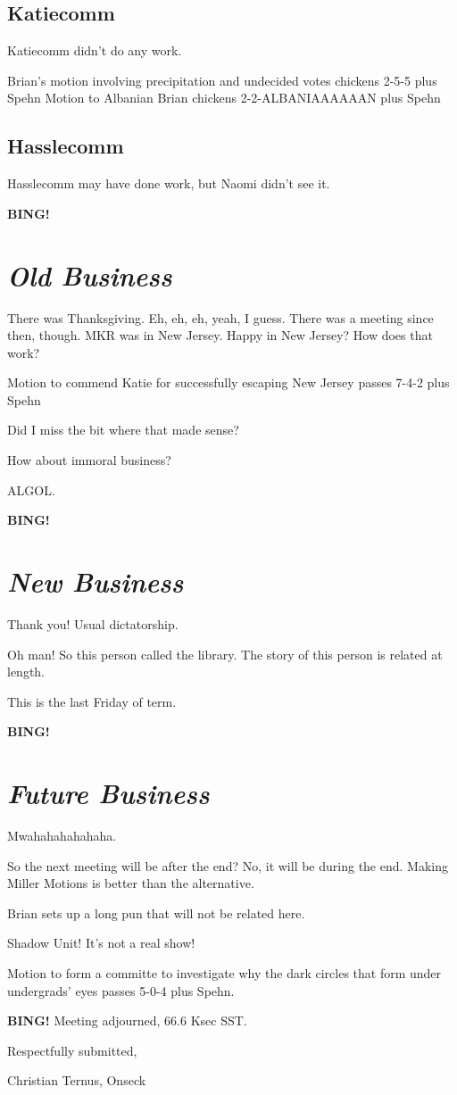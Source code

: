 \documentclass[10pt]{article}
\newcommand{\bing}{{\bf BING!} }
\newcommand{\goto}[1]{\bing \vskip 12pt \section*{{\em{#1}}}}
\newcommand{\ps}{ plus Spehn\xspace}
\begin{document}
\subsection*{Katiecomm}

Katiecomm didn't do any work.

Brian's motion involving precipitation and undecided votes chickens 2-5-5\ps
Motion to Albanian Brian chickens 2-2-ALBANIAAAAAAN\ps

\subsection*{Hasslecomm}

Hasslecomm may have done work, but Naomi didn't see it.

\goto{Old Business}

There was Thanksgiving.  Eh, eh, eh, yeah, I guess.  There was a
meeting since then, though.  MKR was in New Jersey.  Happy in New
Jersey?  How does that work?

Motion to commend Katie for successfully escaping New Jersey passes
7-4-2\ps


Did I miss the bit where that made sense?

How about immoral business?

ALGOL.

\goto{New Business}

Thank you!  Usual dictatorship.

Oh man!  So this person called the library.  The story of this person
is related at length.

This is the last Friday of term.

\goto{Future Business}

Mwahahahahahaha.

So the next meeting will be after the end?  No, it will be during the
end.  Making Miller Motions is better than the alternative.

Brian sets up a long pun that will not be related here.

Shadow Unit!  It's not a real show!

Motion to form a committe to investigate why the dark circles that
form under undergrads' eyes passes 5-0-4\ps.

\bing
\noindent
Meeting adjourned, 66.6 Ksec SST.

\vspace{18pt}

\centerline{Respectfully submitted,}
\centerline{Christian Ternus, Onseck}
\end{document}
